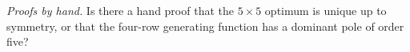 \item \emph{Proofs by hand.} Is there a hand proof that the $5\times5$ optimum
is unique up to symmetry, or that the four-row generating function has a dominant pole of
order five?
